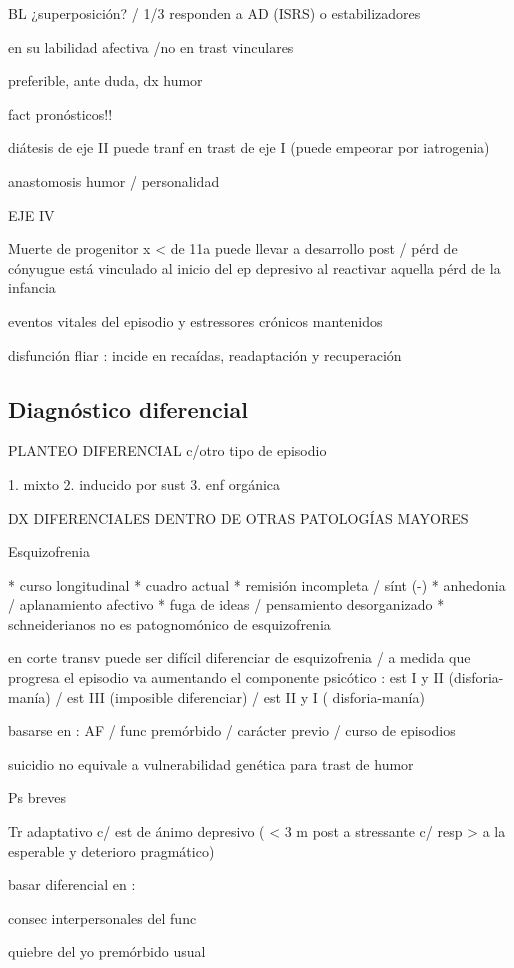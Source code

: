 BL ¿superposición? / 1/3 responden a AD (ISRS) o estabilizadores

en su labilidad afectiva /no en trast vinculares

preferible, ante duda, dx humor

fact pronósticos!!

diátesis de eje II puede tranf en trast de eje I (puede empeorar por iatrogenia)

anastomosis humor / personalidad

EJE IV

Muerte de progenitor x < de 11a puede llevar a desarrollo post / pérd de cónyugue está vinculado al inicio del ep depresivo al reactivar aquella pérd de la infancia

eventos vitales del episodio y estressores crónicos mantenidos

disfunción fliar : incide en recaídas, readaptación y recuperación


\subsection*{Diagnóstico diferencial}
PLANTEO DIFERENCIAL c/otro tipo de episodio

1. mixto
2. inducido por sust
3. enf orgánica

DX DIFERENCIALES DENTRO DE OTRAS PATOLOGÍAS MAYORES

Esquizofrenia

* curso longitudinal
* cuadro actual
* remisión incompleta / sínt (-)
* anhedonia / aplanamiento afectivo
* fuga de ideas / pensamiento desorganizado
* schneiderianos no es patognomónico de esquizofrenia

en corte transv puede ser difícil diferenciar de esquizofrenia / a medida que progresa el episodio va aumentando el componente psicótico : est I y II (disforia-manía) / est III (imposible diferenciar) / est II y I ( disforia-manía)

basarse en : AF / func premórbido / carácter previo / curso de episodios

suicidio no equivale a vulnerabilidad genética para trast de humor

Ps breves

Tr adaptativo c/ est de ánimo depresivo ( < 3 m post a stressante c/ resp > a la esperable y deterioro pragmático)

basar diferencial en :

consec interpersonales del func

quiebre del yo premórbido usual

